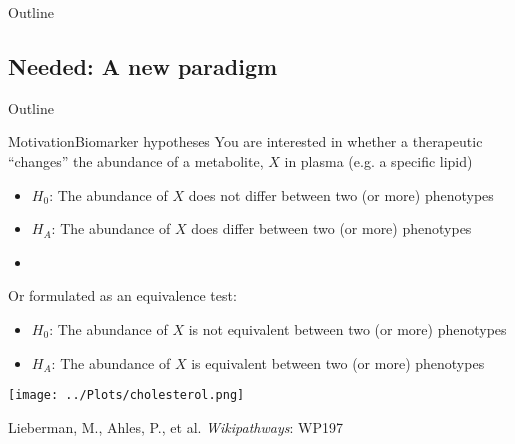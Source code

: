 \documentclass[xcolor=dvipsnames]{beamer}
\begin{document}
\begin{frame}{Outline}
\vspace{-10.5pt}
\tableofcontents[currentsection]
\end{frame}

\subsection{Needed: A new paradigm}
\begin{frame}{Outline}
\vspace{-10.5pt}
\end{frame}

\begin{frame}{Motivation}{Biomarker hypotheses}
	\vspace{-10pt}
	You are interested in whether a therapeutic ``changes'' the abundance of a metabolite, $X$ in plasma (e.g. a specific lipid) \pause
	\begin{itemize}
		\item $H_0$: The abundance of $X$ does not differ between two (or more) phenotypes \pause
		\item $H_A$: The abundance of $X$ does differ between two (or more) phenotypes 
		\item[]
	\end{itemize} \pause
	
	Or formulated as an equivalence test:
	\begin{itemize}
		\item $H_0$: The abundance of $X$ is not equivalent between two (or more) phenotypes  
		\item $H_A$: The abundance of $X$ is equivalent between two (or more) phenotypes  
	\end{itemize}
\end{frame}

\begin{frame}
	\begin{center}
			\texttt{[image: ../Plots/cholesterol.png]}
			
			Lieberman, M., Ahles, P., et al. \emph{Wikipathways}: WP197
	\end{center}
\end{frame}
\end{document}
